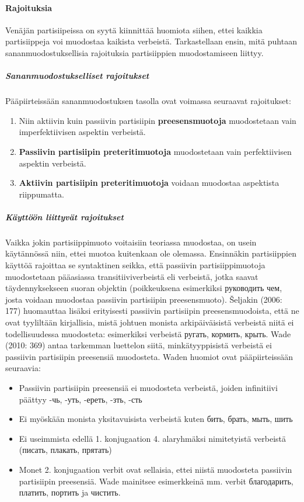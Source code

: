 \documentclass[]{scrartcl}
\providecommand{\tightlist}{%
  \setlength{\itemsep}{0pt}\setlength{\parskip}{0pt}}
\begin{document}
\paragraph{Rajoituksia}\label{rajoituksia}

Venäjän partisiipeissa on syytä kiinnittää huomiota siihen, ettei
kaikkia partisiippeja voi muodostaa kaikista verbeistä. Tarkastellaan
ensin, mitä puhtaan sananmuodostuksellisia rajoituksia partisiippien
muodostamiseen liittyy.

\subparagraph{Sananmuodostukselliset
rajoitukset}\label{sananmuodostukselliset-rajoitukset}

Pääpiirteissään sananmuodostuksen tasolla ovat voimassa seuraavat
rajoitukset:

\begin{enumerate}
\def\labelenumi{\arabic{enumi}.}
\tightlist
\item
  Niin aktiivin kuin passiivin partisiipin \textbf{preesensmuotoja}
  muodostetaan vain imperfektiivisen aspektin verbeistä.
\item
  \textbf{Passiivin partisiipin preteritimuotoja} muodostetaan vain
  perfektiivisen aspektin verbeistä.
\item
  \textbf{Aktiivin partisiipin preteritimuotoja} voidaan muodostaa
  aspektista riippumatta.
\end{enumerate}

\subparagraph{Käyttöön liittyvät
rajoitukset}\label{kuxe4yttuxf6uxf6n-liittyvuxe4t-rajoitukset}

Vaikka jokin partisiippimuoto voitaisiin teoriassa muodostaa, on usein
käytännössä niin, ettei muotoa kuitenkaan ole olemassa. Ensinnäkin
partisiippien käyttöä rajoittaa se syntaktinen seikka, että passiivin
partisiippimuotoja muodostetaan pääasiassa transitiiviverbeistä eli
verbeistä, jotka saavat täydennyksekseen suoran objektin (poikkeuksena
esimerkiksi руководить чем, josta voidaan muodostaa passiivin
partisiipin preesensmuoto). Šeljakin (2006: 177) huomauttaa lisäksi
erityisesti passiivin partisiipin preesensmuodoista, että ne ovat
tyyliltään kirjallisia, mistä johtuen monista arkipäiväisistä verbeistä
niitä ei todellisuudessa muodosteta: esimerkiksi verbeistä ругать,
кормить, крыть. Wade (2010: 369) antaa tarkemman luettelon siitä,
minkätyyppisistä verbeistä ei passiivin partisiipin preesensiä
muodosteta. Waden huomiot ovat pääpiirteissään seuraavia:

\begin{itemize}
\tightlist
\item
  Passiivin partisiipin preesensiä ei muodosteta verbeistä, joiden
  infinitiivi päättyy -чь, -уть, -ереть, -зть, -сть
\item
  Ei myöskään monista yksitavuisista verbeistä kuten бить, брать, мыть,
  шить
\item
  Ei useimmista edellä 1. konjugaation 4. alaryhmäksi nimitetyistä
  verbeistä (писать, плакать, прятать)
\item
  Monet 2. konjugaation verbit ovat sellaisia, ettei niistä muodosteta
  passiivin partisiipin preesensiä. Wade mainitsee esimerkkeinä mm.
  verbit благодарить, платить, портить ja чистить.
\end{itemize}
\end{document}
